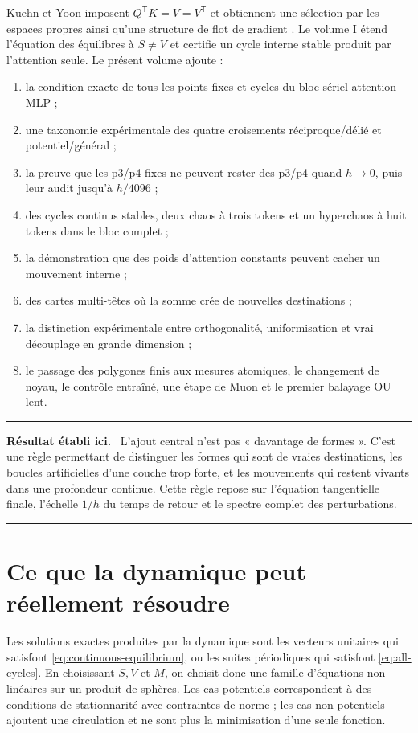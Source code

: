 \documentclass[11pt,a4paper]{article}
\theoremstyle{definition}
\newcommand{\T}{\mathsf T}
\newenvironment{resultbox}
{\begin{center}\begin{minipage}{0.92\textwidth}\color{deepgreen}\hrule\vspace{0.45em}\small\textbf{Résultat établi ici.}\ \color{black}}
{\vspace{0.35em}\color{deepgreen}\hrule\color{black}\end{minipage}\end{center}}
\begin{document}
Kuehn et Yoon imposent $Q^{\T}K=V=V^{\T}$ et obtiennent une sélection par les espaces
propres ainsi qu'une structure de flot de gradient \cite{kuehnyoon2026spectral}. Le
volume I étend l'équation des équilibres à $S\ne V$ et certifie un cycle interne stable
produit par l'attention seule. Le présent volume ajoute :

\begin{enumerate}
  \item la condition exacte de tous les points fixes et cycles du bloc sériel
  attention--MLP ;
  \item une taxonomie expérimentale des quatre croisements réciproque/délié et
  potentiel/général ;
  \item la preuve que les p3/p4 fixes ne peuvent rester des p3/p4 quand $h\to0$, puis
  leur audit jusqu'à $h/4096$ ;
  \item des cycles continus stables, deux chaos à trois tokens et un hyperchaos à huit
  tokens dans le bloc complet ;
  \item la démonstration que des poids d'attention constants peuvent cacher un
  mouvement interne ;
  \item des cartes multi-têtes où la somme crée de nouvelles destinations ;
  \item la distinction expérimentale entre orthogonalité, uniformisation et vrai
  découplage en grande dimension ;
  \item le passage des polygones finis aux mesures atomiques, le changement de noyau,
  le contrôle entraîné, une étape de Muon et le premier balayage OU lent.
\end{enumerate}

\begin{resultbox}
L'ajout central n'est pas « davantage de formes ». C'est une règle permettant de
distinguer les formes qui sont de vraies destinations, les boucles artificielles d'une
couche trop forte, et les mouvements qui restent vivants dans une profondeur continue.
Cette règle repose sur l'équation tangentielle finale, l'échelle $1/h$ du temps de
retour et le spectre complet des perturbations.
\end{resultbox}

\section{Ce que la dynamique peut réellement résoudre}
\label{sec:problems}

Les solutions exactes produites par la dynamique sont les vecteurs unitaires qui
satisfont \eqref{eq:continuous-equilibrium}, ou les suites périodiques qui satisfont
\eqref{eq:all-cycles}. En choisissant $S,V$ et $M$, on choisit donc une famille
d'équations non linéaires sur un produit de sphères. Les cas potentiels correspondent à
des conditions de stationnarité avec contraintes de norme ; les cas non potentiels
ajoutent une circulation et ne sont plus la minimisation d'une seule fonction.
\end{document}
